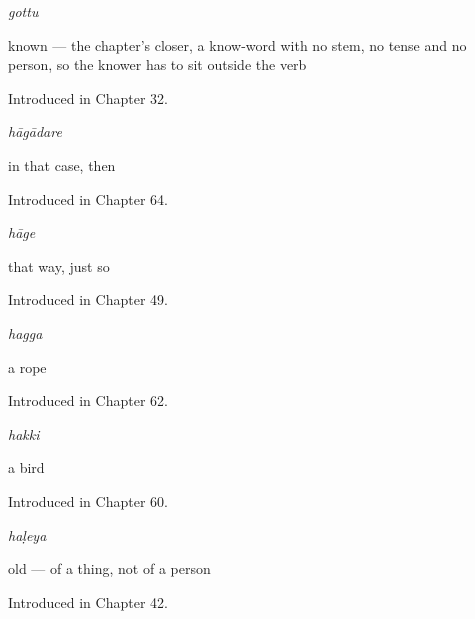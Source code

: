\noindent\begin{minipage}[t]{\linewidth}
\raggedright
\textbf{}\enspace\emph{gottu}\par
\small known — the chapter's closer, a know-word with no stem, no tense and no person, so the knower has to sit outside the verb\par
\footnotesize Introduced in Chapter 32.
\end{minipage}\par\medskip

\noindent\begin{minipage}[t]{\linewidth}
\raggedright
\textbf{}\enspace\emph{hāgādare}\par
\small in that case, then\par
\footnotesize Introduced in Chapter 64.
\end{minipage}\par\medskip

\noindent\begin{minipage}[t]{\linewidth}
\raggedright
\textbf{}\enspace\emph{hāge}\par
\small that way, just so\par
\footnotesize Introduced in Chapter 49.
\end{minipage}\par\medskip

\noindent\begin{minipage}[t]{\linewidth}
\raggedright
\textbf{}\enspace\emph{hagga}\par
\small a rope\par
\footnotesize Introduced in Chapter 62.
\end{minipage}\par\medskip

\noindent\begin{minipage}[t]{\linewidth}
\raggedright
\textbf{}\enspace\emph{hakki}\par
\small a bird\par
\footnotesize Introduced in Chapter 60.
\end{minipage}\par\medskip

\noindent\begin{minipage}[t]{\linewidth}
\raggedright
\textbf{}\enspace\emph{haḷeya}\par
\small old — of a thing, not of a person\par
\footnotesize Introduced in Chapter 42.
\end{minipage}\par\medskip

